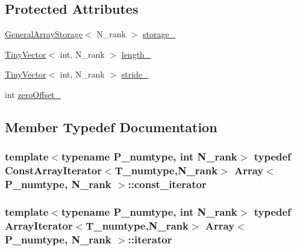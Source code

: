 \subsection*{Protected Attributes}
\begin{DoxyCompactItemize}
\item 
\hyperlink{classGeneralArrayStorage}{General\+Array\+Storage}$<$ N\+\_\+rank $>$ \hyperlink{classArray_ab59a3d60aed828794ddff5988923ad95}{storage\+\_\+}
\item 
\hyperlink{classTinyVector}{Tiny\+Vector}$<$ int, N\+\_\+rank $>$ \hyperlink{classArray_a0cbba3282171c170fd046207fbcc7d14}{length\+\_\+}
\item 
\hyperlink{classTinyVector}{Tiny\+Vector}$<$ int, N\+\_\+rank $>$ \hyperlink{classArray_ae69b93c4b923f1e95cf14421da3a8d72}{stride\+\_\+}
\item 
int \hyperlink{classArray_a4a97370700e3ddf3b894bfb402a7ff11}{zero\+Offset\+\_\+}
\end{DoxyCompactItemize}


\subsection{Member Typedef Documentation}
\hypertarget{classArray_ad00ebe258c5672331aad96dc6d7299ab}{}
\subsubsection[{const\+\_\+iterator}]{\setlength{\rightskip}{0pt plus 5cm}template$<$typename P\+\_\+numtype, int N\+\_\+rank$>$ typedef {\bf Const\+Array\+Iterator}$<${\bf T\+\_\+numtype},N\+\_\+rank$>$ {\bf Array}$<$ P\+\_\+numtype, N\+\_\+rank $>$\+::{\bf const\+\_\+iterator}}\label{classArray_ad00ebe258c5672331aad96dc6d7299ab}
\hypertarget{classArray_a3c33a296e6b0d7290b3f2221660f70f1}{}
\subsubsection[{iterator}]{\setlength{\rightskip}{0pt plus 5cm}template$<$typename P\+\_\+numtype, int N\+\_\+rank$>$ typedef {\bf Array\+Iterator}$<${\bf T\+\_\+numtype},N\+\_\+rank$>$ {\bf Array}$<$ P\+\_\+numtype, N\+\_\+rank $>$\+::{\bf iterator}}\label{classArray_a3c33a296e6b0d7290b3f2221660f70f1}
\hypertarget{classArray_a6a3d9b6a214107a10df219091801f1e0}{}
